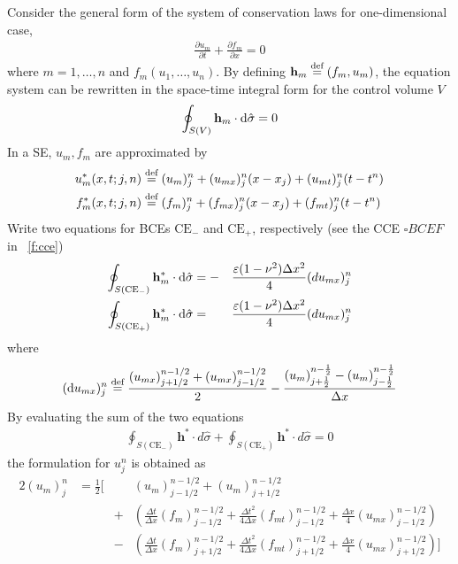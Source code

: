 \documentclass{turgon}
\begin{document}
Consider the general form of the system of conservation laws for
one-dimensional case,
\begin{align}
  \frac{\partial u_m}{\partial t} + \frac{\partial f_m}{\partial x} = 0
  \label{e:syswave}
\end{align}
where $m=1,\ldots,n$ and $f_m(u_1,\ldots,u_n)$.  By defining $\mathbf{h}_m
\defeq (f_m,u_m)$, the equation system can be rewritten in the space-time
integral form for the control volume $V$
\begin{align*}
  \oint_{S(V)}\mathbf{h}_m\cdot \mathop{}\!\mathrm{d}\hat{\sigma} = 0
\end{align*}
In a SE, $u_m, f_m$ are approximated by
\begin{align*}
  u_m^*(x,t;j,n) &\defeq (u_m)_j^n + (u_{mx})_j^n(x-x_j)
                       + (u_{mt})_j^n(t-t^n) \\
  f_m^*(x,t;j,n) &\defeq (f_m)_j^n + (f_{mx})_j^n(x-x_j)
                       + (f_{mt})_j^n(t-t^n)
\end{align*}
Write two equations for BCEs $\mathrm{CE}_-$ and $\mathrm{CE}_+$, respectively
(see the CCE $\square BCEF$ in \figurename~\ref{f:cce})
\begin{alignat*}{2}
  \oint_{S(\mathrm{CE}_-)} \mathbf{h}_m^*\cdot \mathop{}\!\mathrm{d}\hat{\sigma} &=
    -&&\frac{\varepsilon(1-\nu^2)\Delta x^2}{4}(du_{mx})_j^n \\
  \oint_{S(\mathrm{CE}_+)} \mathbf{h}_m^*\cdot \mathop{}\!\mathrm{d}\hat{\sigma} &=
     &&\frac{\varepsilon(1-\nu^2)\Delta x^2}{4}(du_{mx})_j^n
\end{alignat*}
where
\begin{align}
  (\dif u_{mx})_j^n \defeq
    \frac{(u_{mx})_{j+1/2}^{n-1/2}
                + (u_{mx})_{j-1/2}^{n-1/2}}{2}
  - \frac{(u_m)_{j+\frac{1}{2}}^{n-\frac{1}{2}}
        - (u_m)_{j-\frac{1}{2}}^{n-\frac{1}{2}}}
         {\Delta x}
  \label{e:dumx}
\end{align}
By evaluating the sum of the two equations
\begin{align*}
    \oint_{S(\mathrm{CE}_-)} \mathbf{h}^*\cdot d\hat{\sigma}
  + \oint_{S(\mathrm{CE}_+)} \mathbf{h}^*\cdot d\hat{\sigma} = 0
\end{align*}
the formulation for $u_j^n$ is obtained as
\begin{alignat*}{2}
  (u_m)_j^n &= \frac{1}{2}\Big[
      &&(u_m)_{j-1/2}^{n-1/2}+(u_m)_{j+1/2}^{n-1/2} \\
  & &+ &\left(
        \frac{\Delta t}{\Delta x}(f_m)_{j-1/2}^{n-1/2}
      + \frac{\Delta t^2}{4\Delta x}(f_{mt})_{j-1/2}^{n-1/2}
      + \frac{\Delta x}{4}(u_{mx})_{j-1/2}^{n-1/2}
      \right) \\
  & &- &\left(
        \frac{\Delta t}{\Delta x}(f_m)_{j+1/2}^{n-1/2}
      + \frac{\Delta t^2}{4\Delta x}(f_{mt})_{j+1/2}^{n-1/2}
      + \frac{\Delta x}{4}(u_{mx})_{j+1/2}^{n-1/2}
      \right)
    \Big]
\end{alignat*}
\end{document}
